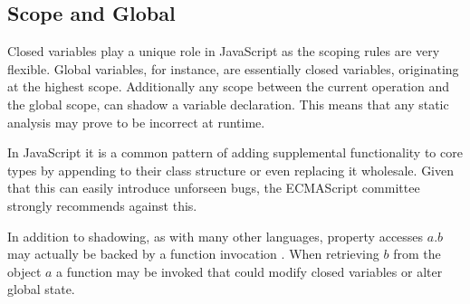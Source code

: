 \subsection{Scope and Global}

Closed variables play a unique role in JavaScript as the scoping rules are very flexible.  Global variables, for instance, are essentially closed variables, originating at the highest scope.  Additionally any scope between the current operation and the global scope, can shadow a variable declaration.  This means that any static analysis may prove to be incorrect at runtime.  

In JavaScript it is a common pattern of adding supplemental functionality to core types by appending to their class structure or even replacing it wholesale.  Given that this can easily introduce unforseen bugs, the ECMAScript committee strongly recommends against this. \cite{prototypeext16}

In addition to shadowing, as with many other languages, property accesses $a.b$ may actually be backed by a function invocation \cite{getter16}.  When retrieving $b$ from the object $a$ a function may be invoked that could modify closed variables or alter global state.  